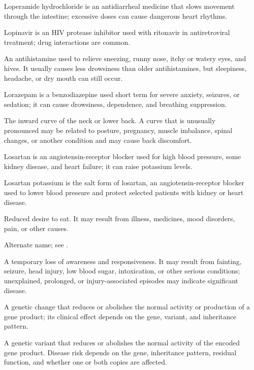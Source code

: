  Loperamide hydrochloride is an antidiarrheal medicine that slows movement through the intestine; excessive doses can cause dangerous heart rhythms.

 Lopinavir is an HIV protease inhibitor used with ritonavir in antiretroviral treatment; drug interactions are common.

 An antihistamine used to relieve sneezing, runny nose, itchy or watery eyes, and hives. It usually causes less drowsiness than older antihistamines, but sleepiness, headache, or dry mouth can still occur.

 Lorazepam is a benzodiazepine used short term for severe anxiety, seizures, or sedation; it can cause drowsiness, dependence, and breathing suppression.

 The inward curve of the neck or lower back. A curve that is unusually pronounced may be related to posture, pregnancy, muscle imbalance, spinal changes, or another condition and may cause back discomfort.

 Losartan is an angiotensin-receptor blocker used for high blood pressure, some kidney disease, and heart failure; it can raise potassium levels.

 Losartan potassium is the salt form of losartan, an angiotensin-receptor blocker used to lower blood pressure and protect selected patients with kidney or heart disease.

 Reduced desire to eat. It may result from illness, medicines, mood disorders, pain, or other causes.

 Alternate name; see .

 A temporary loss of awareness and responsiveness. It may result from fainting, seizure, head injury, low blood sugar, intoxication, or other serious conditions; unexplained, prolonged, or injury-associated episodes may indicate significant disease.

 A genetic change that reduces or abolishes the normal activity or production of a gene product; its clinical effect depends on the gene, variant, and inheritance pattern.

 A genetic variant that reduces or abolishes the normal activity of the encoded gene
product. Disease risk depends on the gene, inheritance pattern, residual function, and
whether one or both copies are affected.

